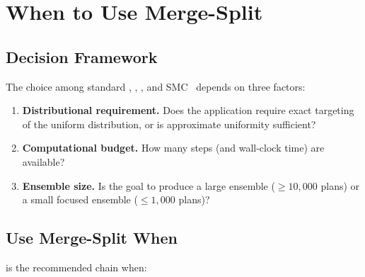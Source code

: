 \section{When to Use Merge-Split}
\label{sec:when-to-use}

\subsection{Decision Framework}

The choice among standard \recom{}, \mergesplit{}, \forestrecom{}, and
SMC~\citep{dellaLibera2026smc} depends on three factors:

\begin{enumerate}
  \item \textbf{Distributional requirement.} Does the application require
        exact targeting of the uniform distribution, or is approximate
        uniformity sufficient?
  \item \textbf{Computational budget.} How many steps (and wall-clock
        time) are available?
  \item \textbf{Ensemble size.} Is the goal to produce a large ensemble
        ($\geq 10{,}000$ plans) or a small focused ensemble
        ($\leq 1{,}000$ plans)?
\end{enumerate}

\subsection{Use Merge-Split When}

\mergesplit{} is the recommended chain when:

